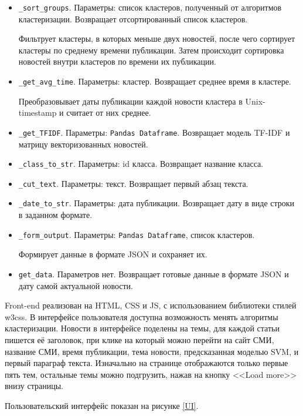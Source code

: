 \begin{itemize}
    \item \verb|_sort_groups|. Параметры: список кластеров, полученный от
    алгоритмов кластеризации. Возвращает отсортированный список кластеров.

    Фильтрует кластеры, в которых меньше двух новостей, после чего сортирует кластеры по среднему времени публикации.
    Затем происходит сортировка новостей внутри кластеров по времени их публикации.

    \item \verb|_get_avg_time|. Параметры: кластер. Возвращает среднее время
    в кластере.

    Преобразовывает даты публикации каждой новости кластера в Unix-timestamp и
    считает от них среднее.

    \item \verb|_get_TFIDF|. Параметры: \verb|Pandas Dataframe|.
    Возвращает модель TF-IDF и матрицу векторизованных новостей.

    \item \verb|_class_to_str|. Параметры: id класса.
    Возвращает название класса.

    \item \verb|_cut_text|. Параметры: текст.
    Возвращает первый абзац текста.

    \item \verb|_date_to_str|. Параметры: дата публикации.
    Возвращает дату в виде строки в заданном формате.

    \item \verb|_form_output|. Параметры: \verb|Pandas Dataframe|, список
    кластеров.

    Формирует данные в формате JSON и сохраняет их.

    \item \verb|get_data|. Параметров нет.
    Возвращает готовые данные в формате JSON и дату самой актуальной новости.
\end{itemize}

Front-end реализован на HTML, CSS и JS, с использованием библиотеки стилей w3css. 
В интерфейсе пользователя доступна возможность менять алгоритмы кластеризации. Новости в интерфейсе
поделены на темы, для каждой статьи пишется её заголовок, при клике на который можно
перейти на сайт СМИ, название СМИ, время публикации, тема новости, предсказанная моделью SVM,
и первый параграф текста. Изначально на странице отображаются только первые пять тем,
остальные темы можно подгрузить, нажав на кнопку <<Load more>> внизу страницы.

Пользовательский интерфейс показан на рисунке \ref{UI}.
